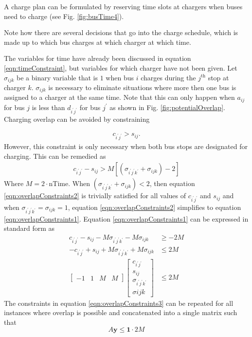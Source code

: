\par A charge plan can be formulated by reserving time slots at chargers when buses need to charge (see Fig. \ref{fig:busTime4}).

	Note how there are several decisions that go into the charge schedule, which is made up to which bus charges at which charger at which time. 
	\par The variables for time have already been discussed in equation \ref{eqn:timeConstraint}, but variables for which charger have not been given.  Let $\sigma_{ijk}$ be a binary variable that is $1$ when bus $i$ charges during the $j^{\text{th}}$ stop at charger $k$. $\sigma_{ijk}$ is necessary to eliminate situations where more then one bus is assigned to a charger at the same time. Note that this can only happen when $a_{ij}$ for bus $j$ is less than $d_{i^{'}j^{'}}$ for bus $j^{'}$ as shown in Fig. \ref{fig:potentialOverlap}. Charging overlap can be avoided by constraining
	
	
	\begin{align}\label{eqn:overlapConstraints1}
	c_{i^{'}j^{'}} > s_{ij}.
\end{align}
However, this constraint is only necessary when both bus stops are designated for charging. This can be remedied as
	\begin{align}\label{eqn:overlapConstraints2}
		c_{i^{'}j^{'}} - s_{ij} > M\left[(\sigma_{i^{'}j^{'}k^{'}} + \sigma_{ijk}) - 2\right]
	\end{align}
	Where $M = 2\cdot\text{nTime}$. When $(\sigma_{i^{'}j^{'}k^{'}} + \sigma_{ijk}) < 2$, then equation \ref{eqn:overlapConstraints2} is trivially satisfied for all values of $c_{i^{'}j^{'}}$ and $s_{ij}$ and when $\sigma_{i^{'}j^{'}k^{'}} = \sigma_{ijk} = 1$, equation \ref{eqn:overlapConstraints2} simplifies to equation \ref{eqn:overlapConstraints1}. Equation \ref{eqn:overlapConstraints1} can be expressed in standard form as 
	\begin{align}\label{eqn:overlapConstraints3}
		c_{i^{'}j^{'}} - s_{ij} - M\sigma_{i^{'}j^{'}k^{'}} - M\sigma_{ijk} &\ge -2M \\
		-c_{i^{'}j^{'}} + s_{ij} + M\sigma_{i^{'}j^{'}k^{'}} + M\sigma_{ijk} &\le 2M \\
		\begin{bmatrix} -1 & 1 & M & M\end{bmatrix} \begin{bmatrix}c_{i^{'}j^{'}}\\ s_{ij} \\ \sigma_{i^{'}j^{'}k^{'}}\\ \sigma{ijk} \end{bmatrix} &\le 2M
	\end{align}
	The constraints in equation \ref{eqn:overlapConstraints3} can be repeated for all instances where overlap is possible and concatenated into a single matrix such that
	\begin{equation}
		A\mathbf{y} \le \mathbf{1}\cdot 2M
	\end{equation}



